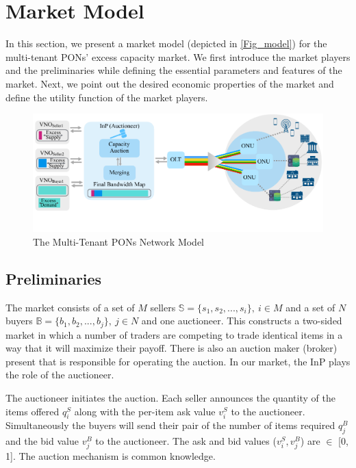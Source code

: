 \section{Market Model}
\label{sec:market-model}
In this section, we present a market model (depicted in \autoref{Fig_model}) for the multi-tenant \acp{PON}' excess capacity market. We first introduce the market players and the preliminaries while defining the essential parameters and features of the market. Next, we point out the desired economic properties of the market and define the utility function of the market players.

\begin{figure}[htbp]
  \centering
  \includegraphics[width=0.99\columnwidth]{Figures/pon.pdf}
\caption{The Multi-Tenant \acp{PON} Network Model}
\label{Fig_model}
\end{figure}

\subsection{Preliminaries}
The market consists of a set of $M$ sellers $\mathbb{S}=\{s_{1}, s_{2}, ...,s_{i}\}, \ i \in M$ and a set of $N$ buyers $\mathbb{B}=\{b_{1}, b_{2}, ...,b_{j}\}, \ j \in N$ and one auctioneer. This constructs a two-sided market in which a number of traders are competing to trade identical items in a way that it will maximize their payoff. There is also an auction maker (broker) present that is responsible for operating the auction. In our market, the \ac{InP} plays the role of the auctioneer.

The auctioneer initiates the auction. Each seller announces the quantity of the items offered $q^S_{i}$ along with the per-item ask value $v^S_{i}$ to the auctioneer. Simultaneously the buyers will send their pair of the number of items required $q^B_{j}$ and the bid value $v^B_{j}$ to the auctioneer. The ask and bid values ($v^S_{i}, v^B_{j}$) are $\in$ [0, 1]. The auction mechanism is common knowledge.

